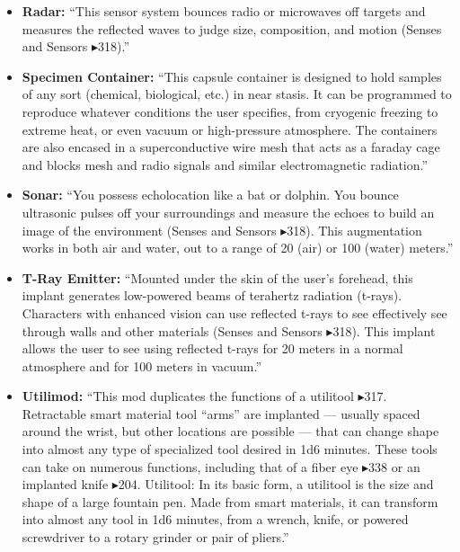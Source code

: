 \begin{itemize}
    \item \textbf{Radar:} “This sensor system bounces radio or microwaves off targets and measures the reflected waves to judge size, composition, and motion (Senses and Sensors $\blacktriangleright$318).” \citep[pg. 318]{ep2e_1.1_2019}

    \item \textbf{Specimen Container:} “This capsule container is designed to hold samples of any sort (chemical, biological, etc.) in near stasis. It can be programmed to reproduce whatever conditions the user specifies, from cryogenic freezing to extreme heat, or even vacuum or high-pressure atmosphere. The containers are also encased in a superconductive wire mesh that acts as a faraday cage and blocks mesh and radio signals and similar electromagnetic radiation.” \citep[pg. 340]{ep2e_1.1_2019}

    \item \textbf{Sonar:} “You possess echolocation like a bat or dolphin. You bounce ultrasonic pulses off your surroundings and measure the echoes to build an image of the environment (Senses and Sensors $\blacktriangleright$318). This augmentation works in both air and water, out to a range of 20 (air) or 100 (water) meters.” \citep[pg. 318]{ep2e_1.1_2019}

    \item \textbf{T-Ray Emitter:} “Mounted under the skin of the user’s forehead, this implant generates low-powered beams of terahertz radiation (t-rays). Characters with enhanced vision can use reflected t-rays to see effectively see through walls and other materials (Senses and Sensors $\blacktriangleright$318). This implant allows the user to see using reflected t-rays for 20 meters in a normal atmosphere and for 100 meters in vacuum.” \citep[pg. 318]{ep2e_1.1_2019}

    \item \textbf{Utilimod:} “This mod duplicates the functions of a utilitool $\blacktriangleright$317. Retractable smart material tool “arms” are implanted — usually spaced around the wrist, but other locations are possible — that can change shape into almost any type of specialized tool desired in 1d6 minutes. These tools can take on numerous functions, including that of a fiber eye $\blacktriangleright$338 or an implanted knife $\blacktriangleright$204. Utilitool: In its basic form, a utilitool is the size and shape of a large fountain pen. Made from smart materials, it can transform into almost any tool in 1d6 minutes, from a wrench, knife, or powered screwdriver to a rotary grinder or pair of pliers.” \citep[pg. 325]{ep2e_1.1_2019}
\end{itemize}


